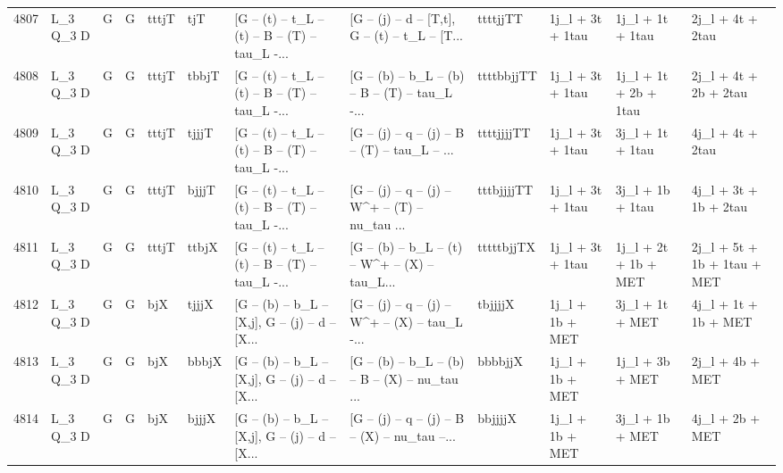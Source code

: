 \begin{tabular}{llllllllllll}
4807 &    L\_3 Q\_3 D &     G &     G &       tttjT &         tjT &  [G -- (t) -- t\_L -- (t) -- B -- (T) -- tau\_L -... &  [G -- (j) -- d -- [T,t], G -- (t) -- t\_L -- [T... &    ttttjjTT &         1j\_l + 3t + 1tau &         1j\_l + 1t + 1tau &                   2j\_l + 4t + 2tau \\
4808 &    L\_3 Q\_3 D &     G &     G &       tttjT &       tbbjT &  [G -- (t) -- t\_L -- (t) -- B -- (T) -- tau\_L -... &  [G -- (b) -- b\_L -- (b) -- B -- (T) -- tau\_L -... &  ttttbbjjTT &         1j\_l + 3t + 1tau &    1j\_l + 1t + 2b + 1tau &              2j\_l + 4t + 2b + 2tau \\
4809 &    L\_3 Q\_3 D &     G &     G &       tttjT &       tjjjT &  [G -- (t) -- t\_L -- (t) -- B -- (T) -- tau\_L -... &  [G -- (j) -- q -- (j) -- B -- (T) -- tau\_L -- ... &  ttttjjjjTT &         1j\_l + 3t + 1tau &         3j\_l + 1t + 1tau &                   4j\_l + 4t + 2tau \\
4810 &    L\_3 Q\_3 D &     G &     G &       tttjT &       bjjjT &  [G -- (t) -- t\_L -- (t) -- B -- (T) -- tau\_L -... &  [G -- (j) -- q -- (j) -- W\textasciicircum + -- (T) -- nu\_tau ... &  tttbjjjjTT &         1j\_l + 3t + 1tau &         3j\_l + 1b + 1tau &              4j\_l + 3t + 1b + 2tau \\
4811 &    L\_3 Q\_3 D &     G &     G &       tttjT &       ttbjX &  [G -- (t) -- t\_L -- (t) -- B -- (T) -- tau\_L -... &  [G -- (b) -- b\_L -- (t) -- W\textasciicircum + -- (X) -- tau\_L... &  tttttbjjTX &         1j\_l + 3t + 1tau &     1j\_l + 2t + 1b + MET &        2j\_l + 5t + 1b + 1tau + MET \\
4812 &    L\_3 Q\_3 D &     G &     G &         bjX &       tjjjX &  [G -- (b) -- b\_L -- [X,j], G -- (j) -- d -- [X... &  [G -- (j) -- q -- (j) -- W\textasciicircum + -- (X) -- tau\_L -... &     tbjjjjX &          1j\_l + 1b + MET &          3j\_l + 1t + MET &               4j\_l + 1t + 1b + MET \\
4813 &    L\_3 Q\_3 D &     G &     G &         bjX &       bbbjX &  [G -- (b) -- b\_L -- [X,j], G -- (j) -- d -- [X... &  [G -- (b) -- b\_L -- (b) -- B -- (X) -- nu\_tau ... &     bbbbjjX &          1j\_l + 1b + MET &          1j\_l + 3b + MET &                    2j\_l + 4b + MET \\
4814 &    L\_3 Q\_3 D &     G &     G &         bjX &       bjjjX &  [G -- (b) -- b\_L -- [X,j], G -- (j) -- d -- [X... &  [G -- (j) -- q -- (j) -- B -- (X) -- nu\_tau --... &     bbjjjjX &          1j\_l + 1b + MET &          3j\_l + 1b + MET &                    4j\_l + 2b + MET \\

\end{tabular}
